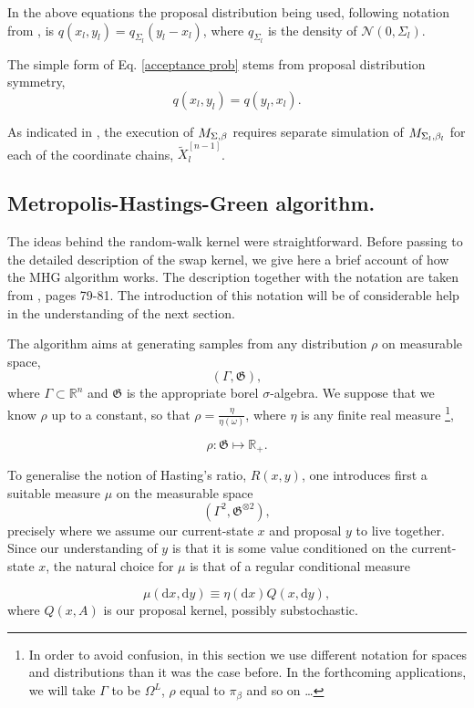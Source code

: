 In the above equations the proposal distribution being used, following notation from \cite{CharlesJ.Geyer}, is $q(x_l,y_l) = q_{\Sigma_l} (y_l - x_l)$, where $q_{\Sigma_l}$ is the density of $\mathcal{N}(0, \Sigma_l)$. 

The simple form of Eq. \ref{acceptance prob} stems from proposal distribution symmetry, $$q(x_l,y_l) = q(y_l,x_l).$$

As indicated in \cite{BłażejMiasojedow}, the execution of $M_{\Sigma,\beta}$ requires separate simulation of $M_{\Sigma_{l},\beta_{l}}$ for each of the coordinate chains,  $\widetilde{X}^{[n-1]}_l$.


\subsection*{Metropolis-Hastings-Green algorithm.}

	The ideas behind the random-walk kernel were straightforward. Before passing to the detailed description of the swap kernel, we give here a brief account of how the MHG algorithm works. The description together with the notation are taken from \cite{CharlesJ.Geyer}, pages 79-81. The introduction of this notation will be of considerable help in the understanding of the next section. 

	The algorithm aims at generating samples from any distribution $\rho$ on measurable space,
$$(\Gamma, \mathfrak{G}),$$
	where $\Gamma \subset \mathbb{R}^n$ and $\mathfrak{G}$ is the appropriate borel $\sigma$-algebra. We suppose that we know $\rho$ up to a constant, so that $\rho = \frac{\eta}{\eta(\omega)}$, where $\eta$ is any finite real measure \footnote{In order to avoid confusion, in this section we use different notation for spaces and distributions than it was the case before. In the forthcoming applications, we will take $\Gamma$ to be $\Omega^L$, $\rho$ equal to $\pi_\beta$ and so on \dots}, 

$$\rho: \mathfrak{G} \mapsto \mathbb{R}_{+}.$$  
	
	To generalise the notion of Hasting's ratio, $R(x,y)$, one introduces first a suitable measure $\mu$ on the measurable space $$(\Gamma^2, \mathfrak{G}^{\otimes 2}),$$ 
precisely where we assume our current-state $x$ and proposal $y$ to live together. Since our understanding of $y$ is that it is some value conditioned on the current-state $x$, the natural choice for $\mu$ is that of a regular conditional measure

$$\mu(\mathrm{d }x, \mathrm{d }y)   \equiv \eta (\mathrm{d} x) Q(x, \mathrm{d } y),$$
where $Q(x,A)$ is our proposal kernel, possibly substochastic.
 
